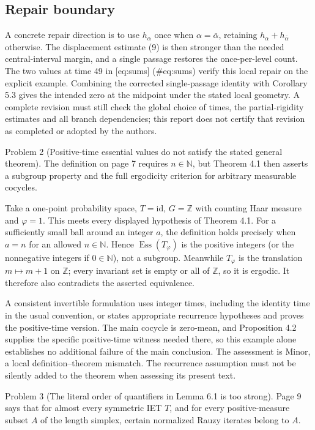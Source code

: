 \documentclass[10pt]{article}
\begin{document}
\subsection*{Repair boundary}
A concrete repair direction is to use \(h_\alpha\) once when \(\alpha=\bar\alpha\), retaining \(h_\alpha+h_{\bar\alpha}\) otherwise. The displacement estimate (9) is then stronger than the needed central-interval margin, and a single passage restores the once-per-level count. The two values at time 49 in [eq:sums] (\#eq:sums) verify this local repair on the explicit example. Combining the corrected single-passage identity with Corollary 5.3 gives the intended zero at the midpoint under the stated local geometry. A complete revision must still check the global choice of times, the partial-rigidity estimates and all branch dependencies; this report does not certify that revision as completed or adopted by the authors.\par
Problem 2 (Positive-time essential values do not satisfy the stated general theorem).  The definition on page 7 requires \(n\in\mathbb N\), but Theorem 4.1 then asserts a subgroup property and the full ergodicity criterion for arbitrary measurable cocycles.\par
Take a one-point probability space, \(T=\mathrm{id}\), \(G=\mathbb Z\) with counting Haar measure and \(\varphi=1\). This meets every displayed hypothesis of Theorem 4.1. For a sufficiently small ball around an integer \(a\), the definition holds precisely when \(a=n\) for an allowed \(n\in\mathbb N\). Hence \(\mathop{\mathrm{Ess}}(T_\varphi)\) is the positive integers (or the nonnegative integers if \(0\in\mathbb N\)), not a subgroup. Meanwhile \(T_\varphi\) is the translation \(m\mapsto m+1\) on \(\mathbb Z\); every invariant set is empty or all of \(\mathbb Z\), so it is ergodic. It therefore also contradicts the asserted equivalence.\par
A consistent invertible formulation uses integer times, including the identity time in the usual convention, or states appropriate recurrence hypotheses and proves the positive-time version. The main cocycle is zero-mean, and Proposition 4.2 supplies the specific positive-time witness needed there, so this example alone establishes no additional failure of the main conclusion. The assessment is Minor, a local definition–theorem mismatch. The recurrence assumption must not be silently added to the theorem when assessing its present text.\par
Problem 3 (The literal order of quantifiers in Lemma 6.1 is too strong).  Page 9 says that for almost every symmetric IET \(T\), and for every positive-measure subset \(A\) of the length simplex, certain normalized Rauzy iterates belong to \(A\).\par
\end{document}

